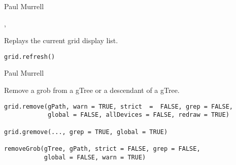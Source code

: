 %
\begin{Author}\relax
Paul Murrell
\end{Author}
%
\begin{SeeAlso}\relax
{},
\end{SeeAlso}
%
\begin{Description}\relax
Replays the current grid display list.
\end{Description}
%
\begin{Usage}
\begin{verbatim}
grid.refresh()
\end{verbatim}
\end{Usage}
%
\begin{Author}\relax
 Paul Murrell 
\end{Author}
%
\begin{Description}\relax
Remove a grob from a gTree or a descendant of a gTree.
\end{Description}
%
\begin{Usage}
\begin{verbatim}
grid.remove(gPath, warn = TRUE, strict  =  FALSE, grep = FALSE,
            global = FALSE, allDevices = FALSE, redraw = TRUE)

grid.gremove(..., grep = TRUE, global = TRUE)

removeGrob(gTree, gPath, strict = FALSE, grep = FALSE,
           global = FALSE, warn = TRUE) 
\end{verbatim}
\end{Usage}
%
